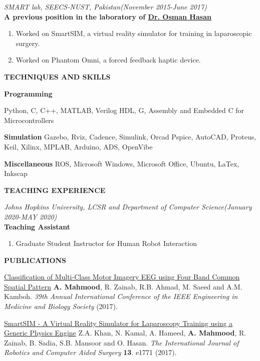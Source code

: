 \textit{SMART lab, SEECS-NUST, Pakistan\hfill(November 2015-June 2017)}\\
\textbf{\rmfamily A previous position in the laboratory of \ul{Dr. Osman Hasan}}

\begin{enumerate}
\item Worked on SmartSIM, a virtual reality simulator for training in laparoscopic surgery.
\item Worked on Phantom Omni, a forced feedback haptic device.
\end{enumerate}

\textbf{TECHNIQUES AND SKILLS}

\textbf{\rmfamily Programming}

\textrm{\noindent Python, C, C++, MATLAB, Verilog HDL, G, Assembly and Embedded C for Microcontrollers}

\textbf{\rmfamily Simulation}
\textrm{\noindent Gazebo, Rviz, Cadence, Simulink, Orcad Pspice, AutoCAD, Proteus, Keil, Xilinx, MPLAB, Arduino, ADS, OpenVibe}

\textbf{\rmfamily Miscellaneous}
\textrm{\noindent ROS, Microsoft Windows, Microsoft Office, Ubuntu, LaTex, Inkscap}

\textbf{TEACHING EXPERIENCE}

\textit{Johns Hopkins University, LCSR and Department of Computer Science\hfill(January 2020-MAY 2020)}\\
\textbf{\rmfamily Teaching Assistant}
\begin{enumerate}
\item Graduate Student Instructor for Human Robot Interaction 
\end{enumerate}


\textbf{PUBLICATIONS}

\rmfamily

{\color{blue} \ul{Classification of Multi-Class Motor Imagery EEG using Four Band Common Spatial Pattern}} 
\textbf{A. Mahmood}, R. Zainab, R.B. Ahmad, M. Saeed and 
A.M. Kamboh. \textit{39th Annual International Conference of the IEEE Engineering in Medicine and Biology Society} (2017).

{\color{blue} \ul{SmartSIM - A Virtual Reality Simulator for Laparoscopy Training using a Generic Physics Engine}} 
Z.A. Khan, N. Kamal, A. Hameed, \textbf{A. Mahmood}, R. Zainab, B. Sadia, S.B. Mansoor and 
O. Hasan. \textit{The International Journal of Robotics and Computer Aided Surgery} \textbf{13}. e1771 (2017).

